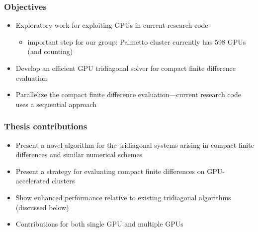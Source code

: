 \begin{frame}
\frametitle{Objectives}
\begin{itemize}
\item Exploratory work for exploiting GPUs
    in current research code
    \begin{itemize}
    \item important step for our group: Palmetto cluster
    currently has 598 GPUs (and counting)
    \end{itemize}
\item Develop an efficient GPU tridiagonal solver
    for compact finite difference evaluation
\item Parallelize the compact finite difference evaluation---current
    research code uses a sequential approach
\end{itemize}
\end{frame}

\begin{frame}
\frametitle{Thesis contributions}
\begin{itemize}
\item Present a novel algorithm for
    the tridiagonal systems arising in
    compact finite differences
    and similar numerical schemes
\item Present a strategy for evaluating compact
    finite differences on GPU-accelerated clusters
\item Show enhanced performance relative to existing
    tridiagonal algorithms (discussed below)
\item Contributions for both single GPU
    and multiple GPUs
\end{itemize}
\end{frame}

